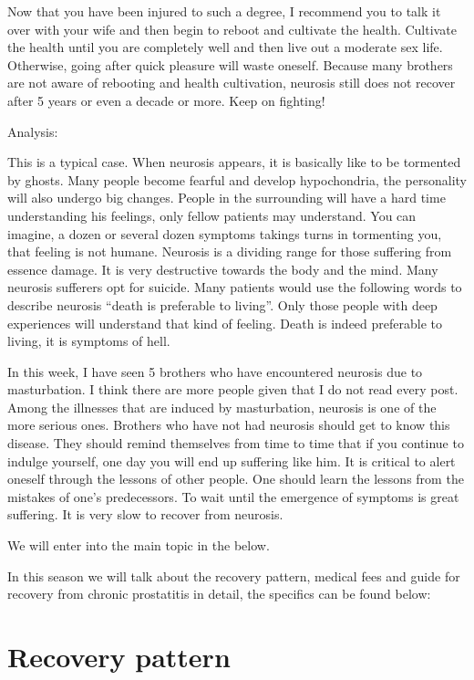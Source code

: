 \documentclass[
]{book}
\begin{document}
Now that you have been injured to such a degree, I recommend you to talk it over with your wife and then begin to reboot and cultivate the health. Cultivate the health until you are completely well and then live out a moderate sex life. Otherwise, going after quick pleasure will waste oneself. Because many brothers are not aware of rebooting and health cultivation, neurosis still does not recover after 5 years or even a decade or more. Keep on fighting!

Analysis:

This is a typical case. When neurosis appears, it is basically like to be tormented by ghosts. Many people become fearful and develop hypochondria, the personality will also undergo big changes. People in the surrounding will have a hard time understanding his feelings, only fellow patients may understand. You can imagine, a dozen or several dozen symptoms takings turns in tormenting you, that feeling is not humane. Neurosis is a dividing range for those suffering from essence damage. It is very destructive towards the body and the mind. Many neurosis sufferers opt for suicide. Many patients would use the following words to describe neurosis ``death is preferable to living''. Only those people with deep experiences will understand that kind of feeling. Death is indeed preferable to living, it is symptoms of hell.

In this week, I have seen 5 brothers who have encountered neurosis due to masturbation. I think there are more people given that I do not read every post. Among the illnesses that are induced by masturbation, neurosis is one of the more serious ones. Brothers who have not had neurosis should get to know this disease. They should remind themselves from time to time that if you continue to indulge yourself, one day you will end up suffering like him. It is critical to alert oneself through the lessons of other people. One should learn the lessons from the mistakes of one's predecessors. To wait until the emergence of symptoms is great suffering. It is very slow to recover from neurosis.

We will enter into the main topic in the below.

In this season we will talk about the recovery pattern, medical fees and guide for recovery from chronic prostatitis in detail, the specifics can be found below:

\hypertarget{recovery-pattern}{%
\section{Recovery pattern}\label{recovery-pattern}}
\end{document}
